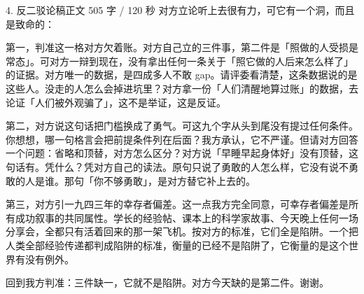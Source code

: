 \documentclass[script,con]{debate}
\begin{document}
\begin{speech}{4. 反二驳论稿}{正文 505 字 / 120 秒}
对方立论听上去很有力，可它有一个洞，而且是致命的：

第一，判准这一格对方欠着账。对方自己立的三件事，第二件是「照做的人受损是常态」。可对方一辩到现在，没有拿出任何一条关于「照它做的人后来怎么样了」的证据。对方唯一的数据，是四成多人不敢 gap。请评委看清楚，这条数据说的是这些人。没走的人怎么会掉进坑里？对方拿一份「人们清醒地算过账」的数据，去论证「人们被外观骗了」，这不是举证，这是反证。

第二，对方说这句话把门槛换成了勇气。可这九个字从头到尾没有提过任何条件。你想想，哪一句格言会把前提条件列在后面？我方承认，它不严谨。但请对方回答一个问题：省略和顶替，对方怎么区分？对方说「早睡早起身体好」没有顶替，这句话有。凭什么？凭对方自己的读法。原句只说了勇敢的人怎么样，它没有说不勇敢的人是谁。那句「你不够勇敢」，是对方替它补上去的。

第三，对方引一九四三年的幸存者偏差。这一点我方完全同意，可幸存者偏差是所有成功叙事的共同属性。学长的经验帖、课本上的科学家故事、今天晚上任何一场分享会，全都只有活着回来的那一架飞机。按对方的标准，它们全是陷阱。一个把人类全部经验传递都判成陷阱的标准，衡量的已经不是陷阱了，它衡量的是这个世界有没有例外。

回到我方判准：三件缺一，它就不是陷阱。对方今天缺的是第二件。谢谢。
\end{speech}
\begin{contingency}
\end{contingency}
\end{document}
